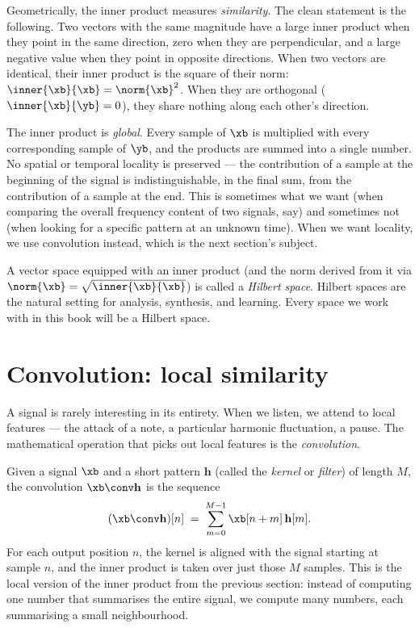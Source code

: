 Geometrically, the inner product measures \emph{similarity}.  The clean
statement is the following.  Two vectors with the same magnitude have a
large inner product when they point in the same direction, zero when
they are perpendicular, and a large negative value when they point in
opposite directions.  When two vectors are identical, their inner product is the
square of their norm: $\inner{\xb}{\xb} = \norm{\xb}^2$.  When they are
orthogonal ($\inner{\xb}{\yb} = 0$), they share nothing along each
other's direction.

The inner product is \emph{global}.  Every sample of $\xb$ is multiplied
with every corresponding sample of $\yb$, and the products are summed
into a single number.  No spatial or temporal locality is preserved ---
the contribution of a sample at the beginning of the signal is
indistinguishable, in the final sum, from the contribution of a sample
at the end.  This is sometimes what we want (when comparing the overall
frequency content of two signals, say) and sometimes not (when looking
for a specific pattern at an unknown time).  When we want locality, we
use convolution instead, which is the next section's subject.

A vector space equipped with an inner product (and the norm derived
from it via $\norm{\xb} = \sqrt{\inner{\xb}{\xb}}$) is called a
\emph{Hilbert space}.  Hilbert spaces are the natural setting for
analysis, synthesis, and learning.  Every space we work with in this book
will be a Hilbert space.

\section{Convolution: local similarity}
\label{sec:convolution}

A signal is rarely interesting in its entirety.  When we listen, we
attend to local features --- the attack of a note, a particular harmonic
fluctuation, a pause.  The mathematical operation that picks out local
features is the \emph{convolution}.

Given a signal $\xb$ and a short pattern $\mathbf{h}$ (called the
\emph{kernel} or \emph{filter}) of length $M$, the convolution
$\xb \conv \mathbf{h}$ is the sequence
\begin{equation}
    (\xb \conv \mathbf{h})[n]
    \;=\;
    \sum_{m=0}^{M-1} \xb[n+m]\, \mathbf{h}[m].
    \label{eq:conv}
\end{equation}
For each output position $n$, the kernel is aligned with the signal
starting at sample $n$, and the inner product is taken over just those
$M$ samples.  This is the local version of the inner product from the
previous section: instead of computing one number that summarises the
entire signal, we compute many numbers, each summarising a small
neighbourhood.

